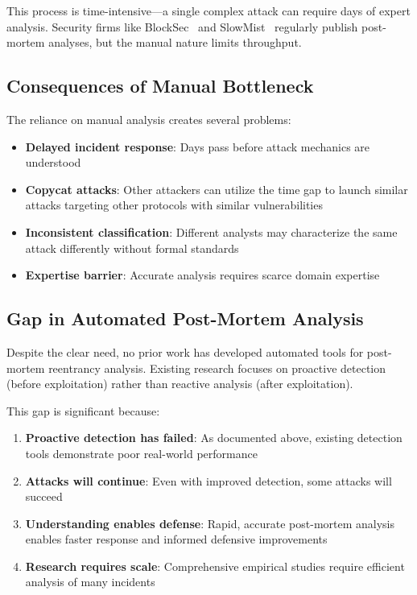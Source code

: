 This process is time-intensive---a single complex attack can require days of expert analysis. Security firms like BlockSec~\cite{attack-report:hype-beans} and SlowMist~\cite{attack-report:lendf-me, attack-report:revest-finance} regularly publish post-mortem analyses, but the manual nature limits throughput.

\subsection{Consequences of Manual Bottleneck}

The reliance on manual analysis creates several problems:
\begin{itemize}
    \item \textbf{Delayed incident response}: Days pass before attack mechanics are understood
    \item \textbf{Copycat attacks}: Other attackers can utilize the time gap to launch similar attacks targeting other protocols with similar vulnerabilities
    \item \textbf{Inconsistent classification}: Different analysts may characterize the same attack differently without formal standards
    \item \textbf{Expertise barrier}: Accurate analysis requires scarce domain expertise
\end{itemize}

\subsection{Gap in Automated Post-Mortem Analysis}

Despite the clear need, no prior work has developed automated tools for post-mortem reentrancy analysis. Existing research focuses on proactive detection (before exploitation) rather than reactive analysis (after exploitation).

This gap is significant because:
\begin{enumerate}
    \item \textbf{Proactive detection has failed}: As documented above, existing detection tools demonstrate poor real-world performance
    \item \textbf{Attacks will continue}: Even with improved detection, some attacks will succeed
    \item \textbf{Understanding enables defense}: Rapid, accurate post-mortem analysis enables faster response and informed defensive improvements
    \item \textbf{Research requires scale}: Comprehensive empirical studies require efficient analysis of many incidents
\end{enumerate}

